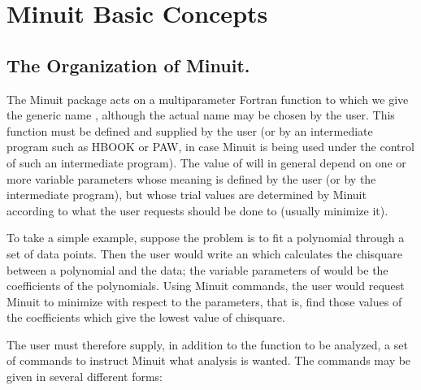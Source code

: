  
\chapter{Minuit Basic Concepts}

\section{The Organization of Minuit.}
The Minuit package acts on a multiparameter Fortran function to which we
give the generic name , although the actual name may be chosen by the user.
This function must be defined and supplied by the user (or by an intermediate
program such as HBOOK\cite{bib-HBOOK} or PAW\cite{bib-PAW}, 
in case Minuit is being used under the
control of such an intermediate program).
The value of  will in general depend on one or more variable parameters
whose meaning is defined by the user (or by the intermediate program),
but whose trial values are determined by Minuit according to what the user
requests should be done to  (usually minimize it).
 
To take a simple example, suppose the problem is to fit a polynomial through
a set of data points.
Then the user would write an  which calculates the chisquare between a
polynomial and the data; the variable parameters of  would be the
coefficients of the polynomials.  Using Minuit commands, the user would request
Minuit to minimize  with respect to the parameters, that is, find those
values of the coefficients which give the lowest value of chisquare.
 
The user must therefore supply, in addition to the function to be analyzed,
a set of commands to instruct Minuit what analysis is wanted.
The commands may be given in several different forms:

